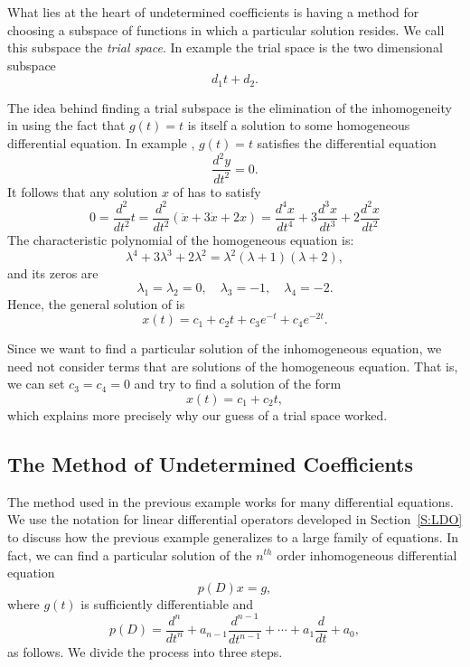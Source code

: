 What lies at the heart of undetermined coefficients is having a method 
for choosing a subspace of functions in which a particular solution resides.  
We call this subspace the {\em trial space}.  In example 
 the trial space is the two dimensional subspace
\[
d_1t + d_2.
\]

The idea behind finding a trial subspace is the elimination of the 
inhomogeneity in  using the fact that $g(t)=t$ is 
itself a solution to some homogeneous differential equation.  In example 
, $g(t)=t$ satisfies the differential equation
\[
\frac{d^2y}{dt^2} = 0.
\]
It follows that any solution $x$ of  has to satisfy
\begin{equation}  \label{e:undetc2}
0 = \frac{d^2}{dt^2}t=\frac{d^2}{dt^2}(\ddot{x} + 3\dot{x}+2x) = 
\frac{d^4x}{dt^4} + 3\frac{d^3x}{dt^3} + 2\frac{d^2x}{dt^2}
\end{equation}
The characteristic 
polynomial
of the homogeneous equation 
 is: 
\[
\lambda^4 + 3\lambda^3 + 2\lambda^2 = \lambda^2(\lambda+1)(\lambda+2),
\]
and its zeros are
\[
\lambda_1=\lambda_2=0,\quad \lambda_3=-1,\quad \lambda_4 = -2.
\]
Hence, the general solution of  is
\[
x(t) = c_1 + c_2 t + c_3 e^{-t} + c_4 e^{-2t}.
\]

Since we want to find a particular solution 
of the inhomogeneous equation, 
we need not consider terms that are solutions of the homogeneous equation. 
That is, we can set $c_3=c_4=0$ and try to find a solution of the form
\[
x(t) = c_1 + c_2 t,
\]
which explains more precisely why our guess of a trial space worked.


\subsection*{The Method of Undetermined Coefficients}

The method used in the previous example works for many differential 
equations.  We use the notation for 
linear differential operators 
developed in Section~\ref{S:LDO} to discuss how the previous example 
generalizes to a large family of equations.  In fact, we can find a 
particular solution of the $n^{th}$ order inhomogeneous differential equation 
\begin{equation}  \label{eq:nconst2}
p(D)x = g,
\end{equation}
where $g(t)$ is sufficiently differentiable and 
\[
p(D) = \frac{d^n}{dt^n} + a_{n-1}\frac{d^{n-1}}{dt^{n-1}} + \cdots + 
a_1\frac{d}{dt}+a_0,
\]
as follows.  We divide the process into three steps.

